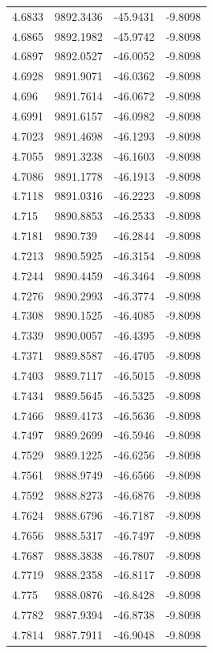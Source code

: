 \begin{table}[H]
\begin{tabular}{llll}
4.6833 & 9892.3436 & -45.9431 & -9.8098 \\
4.6865 & 9892.1982 & -45.9742 & -9.8098 \\
4.6897 & 9892.0527 & -46.0052 & -9.8098 \\
4.6928 & 9891.9071 & -46.0362 & -9.8098 \\
4.696 & 9891.7614 & -46.0672 & -9.8098 \\
4.6991 & 9891.6157 & -46.0982 & -9.8098 \\
4.7023 & 9891.4698 & -46.1293 & -9.8098 \\
4.7055 & 9891.3238 & -46.1603 & -9.8098 \\
4.7086 & 9891.1778 & -46.1913 & -9.8098 \\
4.7118 & 9891.0316 & -46.2223 & -9.8098 \\
4.715 & 9890.8853 & -46.2533 & -9.8098 \\
4.7181 & 9890.739 & -46.2844 & -9.8098 \\
4.7213 & 9890.5925 & -46.3154 & -9.8098 \\
4.7244 & 9890.4459 & -46.3464 & -9.8098 \\
4.7276 & 9890.2993 & -46.3774 & -9.8098 \\
4.7308 & 9890.1525 & -46.4085 & -9.8098 \\
4.7339 & 9890.0057 & -46.4395 & -9.8098 \\
4.7371 & 9889.8587 & -46.4705 & -9.8098 \\
4.7403 & 9889.7117 & -46.5015 & -9.8098 \\
4.7434 & 9889.5645 & -46.5325 & -9.8098 \\
4.7466 & 9889.4173 & -46.5636 & -9.8098 \\
4.7497 & 9889.2699 & -46.5946 & -9.8098 \\
4.7529 & 9889.1225 & -46.6256 & -9.8098 \\
4.7561 & 9888.9749 & -46.6566 & -9.8098 \\
4.7592 & 9888.8273 & -46.6876 & -9.8098 \\
4.7624 & 9888.6796 & -46.7187 & -9.8098 \\
4.7656 & 9888.5317 & -46.7497 & -9.8098 \\
4.7687 & 9888.3838 & -46.7807 & -9.8098 \\
4.7719 & 9888.2358 & -46.8117 & -9.8098 \\
4.775 & 9888.0876 & -46.8428 & -9.8098 \\
4.7782 & 9887.9394 & -46.8738 & -9.8098 \\
4.7814 & 9887.7911 & -46.9048 & -9.8098 \\

\end{tabular}
\end{table}
